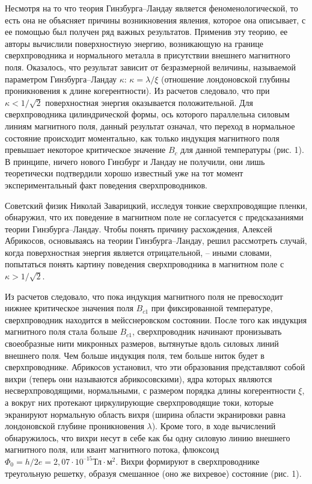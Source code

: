 Несмотря на то что теория Гинзбурга–Ландау является феноменологической, то 
есть она не объясняет причины возникновения явления, которое она описывает, с 
ее помощью был получен ряд важных результатов. Применив эту теорию, ее авторы 
вычислили поверхностную энергию, возникающую на границе сверхпроводника и 
нормального металла в присутствии внешнего магнитного поля. Оказалось, что 
результат зависит от безразмерной величины, называемой параметром 
Гинзбурга–Ландау \( \kappa \): \( \kappa = \lambda/\xi \) (отношение 
лондоновской глубины проникновения к длине когерентности). Из расчетов 
следовало, что при \( \kappa < 1/\sqrt{2} \) поверхностная энергия оказывается 
положительной. Для сверхпроводника цилиндрической формы, ось которого 
параллельна силовым линиям магнитного поля, данный результат означал, что 
переход в нормальное состояние происходит моментально, как только индукция 
магнитного поля превышает некоторое критическое значение \( B_c \) для данной 
температуры (рис. 1). В принципе, ничего нового Гинзбург и Ландау не получили, 
они лишь теоретически подтвердили хорошо известный уже на тот момент 
экспериментальный факт поведения сверхпроводников.

Советский физик Николай Заварицкий, исследуя тонкие сверхпроводящие пленки, 
обнаружил, что их поведение в магнитном поле не согласуется с предсказаниями 
теории Гинзбурга–Ландау. Чтобы понять причину расхождения, Алексей Абрикосов, 
основываясь на теории Гинзбурга–Ландау, решил рассмотреть случай, когда 
поверхностная энергия является отрицательной, -- иными словами, попытаться 
понять картину поведения сверхпроводника в магнитном поле с 
\( \kappa > 1/\sqrt{2} \).

Из расчетов следовало, что пока индукция магнитного поля не превосходит нижнее 
критическое значения поля \( B_{c1} \) при фиксированной температуре, 
сверхпроводник находится в мейсснеровском состоянии. После того как индукция 
магнитного поля стала больше \( B_{c1} \), сверхпроводник начинают пронизывать 
своеобразные нити микронных размеров, вытянутые вдоль силовых линий внешнего 
поля. Чем больше индукция поля, тем больше ниток будет в сверхпроводнике. 
Абрикосов установил, что эти образования представляют собой вихри (теперь они 
называются абрикосовскими), ядра которых являются несверхпроводящими, 
нормальными, с размером порядка длины когерентности \( \xi \), а вокруг них 
протекают циркулирующие сверхпроводящие токи, которые экранируют нормальную 
область вихря (ширина области экранировки равна лондоновской глубине 
проникновения \( \lambda \)). Кроме того, в ходе вычислений обнаружилось, что 
вихри несут в себе как бы одну силовую линию внешнего магнитного поля, или 
квант магнитного потока, флюксоид 
\( \Phi_0 = h/2e = 2,07\cdot10^{–15} \text{Тл}\cdot{м}^2 \). Вихри формируют в 
сверхпроводнике треугольную решетку, образуя смешанное (оно же вихревое) 
состояние (рис. 1).

